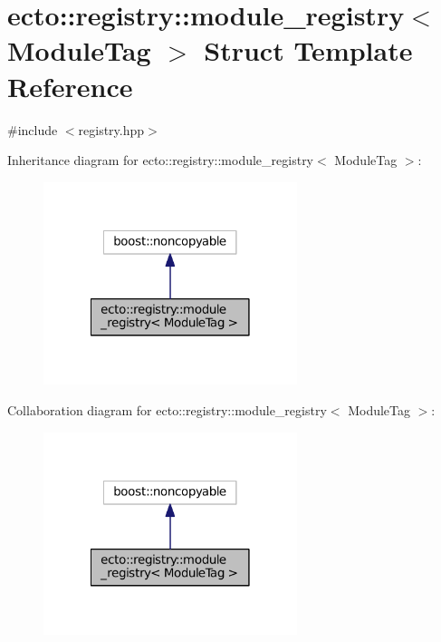 \hypertarget{structecto_1_1registry_1_1module__registry}{\section{ecto\-:\-:registry\-:\-:module\-\_\-registry$<$ Module\-Tag $>$ Struct Template Reference}
\label{structecto_1_1registry_1_1module__registry}
}


{\ttfamily \#include $<$registry.\-hpp$>$}



Inheritance diagram for ecto\-:\-:registry\-:\-:module\-\_\-registry$<$ Module\-Tag $>$\-:\nopagebreak
\begin{figure}[H]
\begin{center}
\leavevmode
\includegraphics[width=210pt]{structecto_1_1registry_1_1module__registry__inherit__graph}
\end{center}
\end{figure}


Collaboration diagram for ecto\-:\-:registry\-:\-:module\-\_\-registry$<$ Module\-Tag $>$\-:\nopagebreak
\begin{figure}[H]
\begin{center}
\leavevmode
\includegraphics[width=210pt]{structecto_1_1registry_1_1module__registry__coll__graph}
\end{center}
\end{figure}
